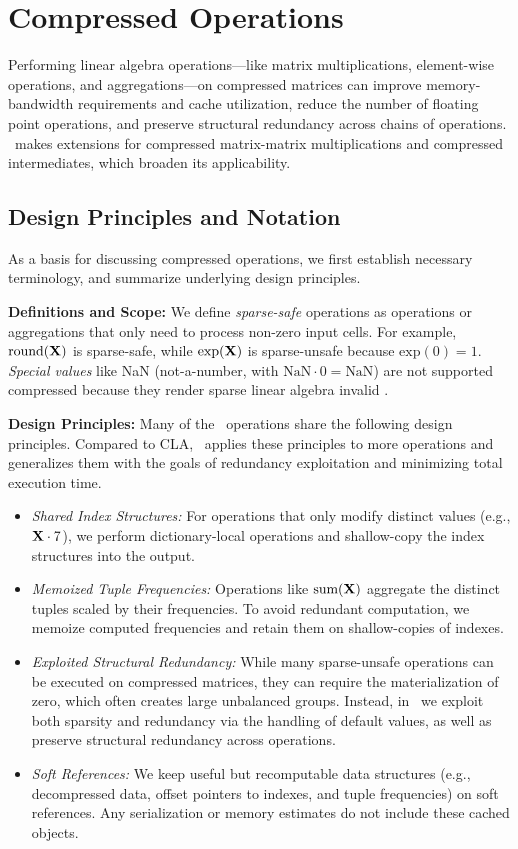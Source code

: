 \section{Compressed Operations}
\label{sec:ops}

Performing linear algebra operations---like matrix multiplications, element-wise operations,
and aggregations---on compressed matrices can improve memory-bandwidth requirements and cache utilization,
reduce the number of floating point operations, and preserve structural redundancy across chains of operations.
\name\ makes extensions for compressed matrix-matrix multiplications and compressed intermediates, which broaden its applicability.

\subsection{Design Principles and Notation}

As a basis for discussing compressed operations, we first establish necessary terminology, and summarize underlying design principles.

\textbf{Definitions and Scope:}
We define \emph{sparse-safe} operations as operations or aggregations that only need to process non-zero input cells.
For example, $\text{round}(\mathbf{X})$ is sparse-safe, while $\text{exp}(\mathbf{X})$ is sparse-unsafe because $\text{exp}(0) = 1$.
\emph{Special values} like NaN (not-a-number, with $\text{NaN} \cdot 0 = \text{NaN}$) are not supported compressed because they render sparse linear algebra invalid \cite{Sommer0ERH19}.

\textbf{Design Principles:}
Many of the \name \ operations share the following design principles. Compared to CLA, \name\ applies these principles to more operations and generalizes them with the goals of redundancy exploitation and minimizing total execution time.
\begin{itemize}
	\item \emph{Shared Index Structures:} For operations that only modify distinct values (e.g., $\mathbf{X} \cdot 7$), we perform dictionary-local operations and shallow-copy the index structures into the output.
	\item \emph{Memoized Tuple Frequencies:} Operations like $\text{sum}(\mathbf{X})$ aggregate the distinct tuples scaled by their frequencies. To avoid redundant computation, we memoize computed frequencies and retain them on shallow-copies of indexes. 
	\item \emph{Exploited Structural Redundancy:} While many sparse-unsafe operations can be executed on compressed matrices, they can require the materialization of zero, which often creates large unbalanced groups. Instead, in \name\, we exploit both sparsity and redundancy via the handling of default values, as well as preserve structural redundancy across operations.
	\item \emph{Soft References:} We keep useful but recomputable data structures (e.g., decompressed data, offset pointers to indexes, and tuple frequencies) on soft references. Any serialization or memory estimates do not include these cached objects.
\end{itemize}

